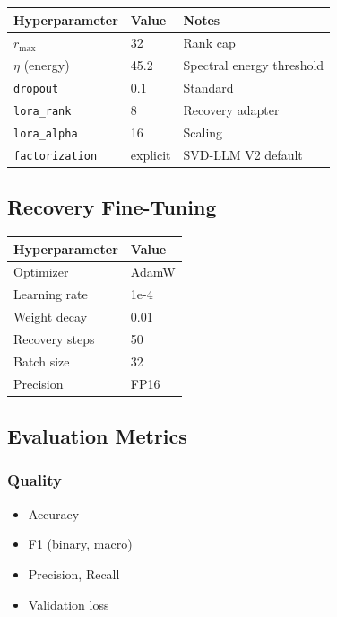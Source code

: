 \begin{table}[H]
\centering
\small
\begin{tabular}{lll}
\toprule
\textbf{Hyperparameter} & \textbf{Value} & \textbf{Notes} \\
\midrule
$r_\text{max}$ & 32 & Rank cap \\
$\eta$ (energy) & 45.2 & Spectral energy threshold \\
\texttt{dropout} & 0.1 & Standard \\
\texttt{lora\_rank} & 8 & Recovery adapter \\
\texttt{lora\_alpha} & 16 & Scaling \\
\texttt{factorization} & explicit & SVD-LLM V2 default \\
\bottomrule
\end{tabular}
\end{table}

\subsection{Recovery Fine-Tuning}

\begin{table}[H]
\centering
\small
\begin{tabular}{ll}
\toprule
\textbf{Hyperparameter} & \textbf{Value} \\
\midrule
Optimizer & AdamW \\
Learning rate & 1e-4 \\
Weight decay & 0.01 \\
Recovery steps & 50 \\
Batch size & 32 \\
Precision & FP16 \\
\bottomrule
\end{tabular}
\end{table}

\subsection{Evaluation Metrics}

\subsubsection{Quality}

\begin{itemize}
\item Accuracy
\item F1 (binary, macro)
\item Precision, Recall
\item Validation loss

\end{itemize}

